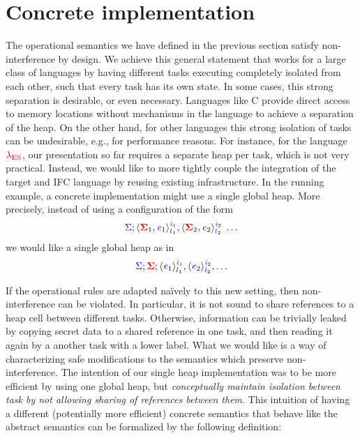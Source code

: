 \documentclass{sigplanconf}
\newcommand{\Varid}[1]{\mathit{#1}}
\newcommand{\Red}[1]{{\color{red} #1}}
\begin{document}
\section{Concrete implementation}
\label{sec:concrete}

\newcommand{\con}[1]{\ensuremath{{\color{red} #1}}}
\newcommand{\abs}[1]{\ensuremath{{\color{blue} #1}}}

The operational semantics we have defined in the previous section
satisfy non-interference by design.
We achieve this general statement that works for a large class of
languages by having different tasks executing completely isolated from
each other, such that every task has its own state.
In some cases, this strong separation is desirable, or even necessary.
Languages like C provide direct access to memory locations without
mechanisms in the language to achieve a separation of the heap.
On the other hand, for other languages this
strong isolation of tasks can be
undesirable, e.g., for performance reasons.
For instance, for the language \ensuremath{\Red{\lambda_{\text{ES}}}}, our presentation so far
requires a separate heap per task, which is not very practical.
Instead, we would like to
more tightly couple the integration of the target and IFC
language by reusing existing infrastructure.  In the running example,
a concrete implementation might use a single global heap.
More precisely, instead of using a configuration of the form
\[\ensuremath{\ifc{\Sigma};\langle \tar{\Sigma}_{1}, \ifc{\Varid{e}}_{1}\rangle^{\ifc{\Varid{i}}_{1}}_{\ifc{l}_{1}},\langle \tar{\Sigma}_{2}, \ifc{\Varid{e}}_{2}\rangle^{\ifc{\Varid{i}}_{2}}_{\ifc{l}_{2}}\;\ldots}\]
we would like a single global heap as in
\[\ensuremath{\ifc{\Sigma};\tar{\Sigma};\langle \ifc{\Varid{e}}_{1}\rangle^{\ifc{\Varid{i}}_{1}}_{\ifc{l}_{1}},\langle \ifc{\Varid{e}}_{2}\rangle^{\ifc{\Varid{i}}_{2}}_{\ifc{l}_{2}},\ldots}\]

If the operational rules are adapted na\"ively to this new setting,
then non-interference can be violated.  In particular, it is not
sound to share references to a heap cell between different tasks.
Otherwise, information can be trivially leaked by copying
secret data to a shared reference in one task, and then
reading it again by a another task with a lower label.
What we would like is a way of characterizing safe modifications to
the semantics which preserve non-interference.
The intention of our single heap implementation was to be more efficient
by using one global heap, but \emph{conceptually maintain isolation between
task by not allowing sharing of references between them}.
This intuition of having a different (potentially more efficient)
concrete semantics that behave like the abstract semantics
can be formalized by the following definition:
\end{document}
